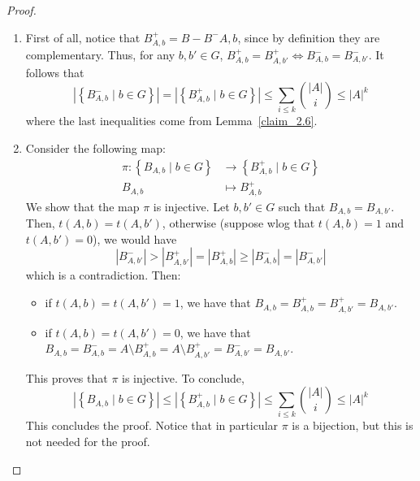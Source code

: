         \begin{proof}
        \begin{enumerate}
            \item First of all, notice that $B^+_{A,b} = B - B^-{A,b}$, since by definition they are complementary.
                Thus, for any $b, b' \in G$, $B^+_{A,b} = B^+_{A,b'} \Leftrightarrow B^-_{A,b} = B^-_{A,b'}$.
                It follows that
                $$
                    \left| \left\{ B^-_{A,b} \mid b \in G \right\} \right| =
                    \left| \left\{ B^+_{A,b} \mid b \in G \right\} \right| \leq
                    \sum_{i \leq k} \binom{|A|}{i} \leq |A|^k
                $$
                where the last inequalities come from Lemma~\ref{claim_2.6}.
            \item Consider the following map:
                \begin{align*}
                    \pi: \left\{ B_{A,b} \mid b \in G \right\} & \longrightarrow \left\{ B^+_{A,b} \mid b \in G \right\} \\
                                                       B_{A,b} & \longmapsto B^+_{A,b}
                \end{align*}
                We show that the map $\pi$ is injective.
                Let $b,b' \in G$ such that $B_{A,b} = B_{A,b'}$.
                Then, $t(A,b) = t(A,b')$, otherwise (suppose wlog that $t(A,b) = 1$ and $t(A,b') = 0$), we would have
                $$
                    \left| B^-_{A,b'} \right| > \left| B^+_{A,b'} \right| = \left| B^+_{A,b} \right| \geq
                        \left| B^-_{A,b} \right| = \left| B^-_{A,b'} \right|
                $$
                which is a contradiction.
                Then:
                \begin{itemize}
                    \item if $t(A,b) = t(A,b') = 1$, we have that $B_{A,b} = B^+_{A,b} = B^+_{A,b'} = B_{A,b'}$.
                    \item if $t(A,b) = t(A,b') = 0$, we have that
                    $B_{A,b} = B^-_{A,b} = A \setminus B^+_{A,b} = A \setminus B^+_{A,b'} = B^-_{A,b'} = B_{A,b'}$.
                \end{itemize}
                This proves that $\pi$ is injective.
                To conclude,
                $$
                    \left| \left\{ B_{A,b} \mid b \in G \right\} \right| \leq
                    \left| \left\{ B^+_{A,b} \mid b \in G \right\} \right| \leq
                    \sum_{i \leq k} \binom{|A|}{i} \leq |A|^k
                $$
                This concludes the proof.
                Notice that in particular $\pi$ is a bijection, but this is not needed for the proof.
        \end{enumerate}
        \end{proof}

